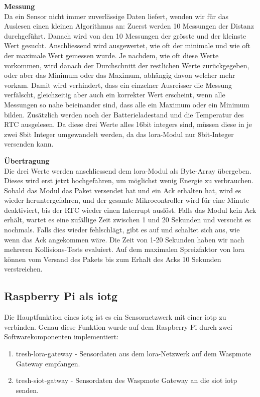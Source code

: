 \textbf{Messung} \\
Da ein Sensor nicht immer zuverlässige Daten liefert, wenden wir für das Auslesen einen kleinen Algorithmus an: Zuerst werden 10 Messungen der Distanz durchgeführt. Danach wird von den 10 Messungen der grösste und der kleinste Wert gesucht. Anschliessend wird ausgewertet, wie oft der minimale und wie oft der maximale Wert gemessen wurde. Je nachdem, wie oft diese Werte vorkommen, wird danach der Durchschnitt der restlichen Werte zurückgegeben, oder aber das Minimum oder das Maximum, abhängig davon welcher mehr vorkam. Damit wird verhindert, dass ein einzelner Ausreisser die Messung verfälscht, gleichzeitig aber auch ein korrekter Wert erscheint, wenn alle Messungen so nahe beieinander sind, dass alle ein Maximum oder ein Minimum bilden.
Zusätzlich werden noch der Batterieladestand und die Temperatur des RTC ausgelesen. Da diese drei Werte alles 16bit integers sind, müssen diese in je zwei 8bit Integer umgewandelt werden, da das \gls{lora}-Modul nur 8bit-Integer versenden kann.

\textbf{Übertragung} \\
Die drei Werte werden anschliessend dem \gls{lora}-Modul als Byte-Array übergeben. Dieses wird erst jetzt hochgefahren, um möglichst wenig Energie zu verbrauchen. Sobald das Modul das Paket versendet hat und ein Ack erhalten hat, wird es wieder heruntergefahren, und der gesamte Mikrocontroller wird für eine Minute deaktiviert, bis der RTC wieder einen Interrupt auslöst. Falls das Modul kein Ack erhält, wartet es eine zufällige Zeit zwischen 1 und 20 Sekunden und versucht es nochmals. Falls dies wieder fehlschlägt, gibt es auf und schaltet sich aus, wie wenn das Ack angekommen wäre.
Die Zeit von 1-20 Sekunden haben wir nach mehreren Kollisions-Tests evaluiert. Auf dem maximalen Spreizfaktor von \gls{lora} können vom Versand des Pakets bis zum Erhalt des Acks 10 Sekunden verstreichen.


\subsection{Raspberry Pi als \gls{iotg}}

Die Hauptfunktion eines \gls{iotg} ist es ein Sensornetzwerk mit einer \gls{iotp} zu verbinden. Genau diese Funktion wurde auf dem Raspberry Pi durch zwei Softwarekomponenten implementiert:

\begin{enumerate}
	\item tresh-lora-gateway - Sensordaten aus dem \gls{lora}-Netzwerk auf dem Waspmote Gateway empfangen.
    \item tresh-siot-gatway - Sensordaten des Waspmote Gateway an die \gls{siot} \gls{iotp} senden.
\end{enumerate}

